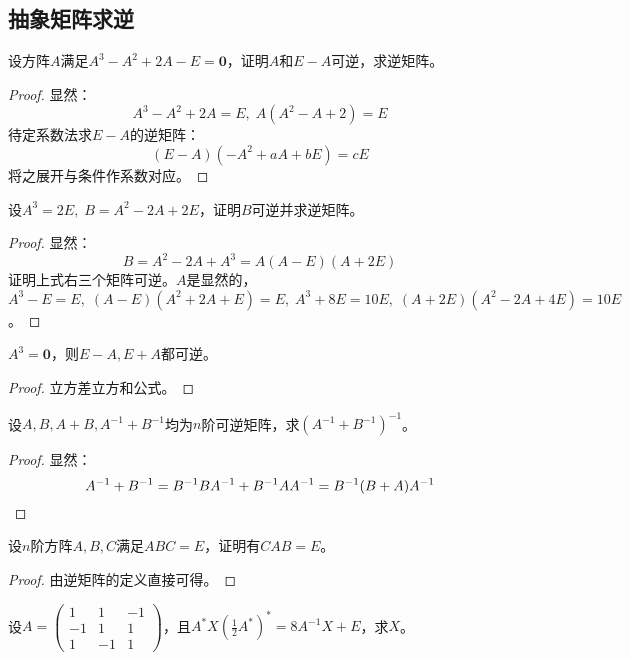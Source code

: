 \subsection{抽象矩阵求逆}
\begin{theorem}
	设方阵$A$满足$A^3-A^2+2A-E=\mathbf{0}$，证明$A$和$E-A$可逆，求逆矩阵。
\end{theorem}
\begin{proof}
	显然：
	\begin{equation*}
		A^3-A^2+2A=E,\;A(A^2-A+2)=E
	\end{equation*} 
	待定系数法求$E-A$的逆矩阵：
	\begin{equation*}
		(E-A)(-A^2+aA+bE)=cE
	\end{equation*}
	将之展开与条件作系数对应。
\end{proof}
\begin{theorem}
	设$A^3=2E,\;B=A^2-2A+2E$，证明$B$可逆并求逆矩阵。
\end{theorem}
\begin{proof}
	显然：
	\begin{equation*}
		B=A^2-2A+A^3=A(A-E)(A+2E)
	\end{equation*}
	证明上式右三个矩阵可逆。$A$是显然的，$A^3-E=E,\;(A-E)(A^2+2A+E)=E,\;A^3+8E=10E,\;(A+2E)(A^2-2A+4E)=10E$。
\end{proof}
\begin{theorem}
	$A^3=\mathbf{0}$，则$E-A,E+A$都可逆。
\end{theorem}
\begin{proof}
	立方差立方和公式。
\end{proof}
\begin{theorem}
	设$A,B,A+B,A^{-1}+B^{-1}$均为$n$阶可逆矩阵，求$(A^{-1}+B^{-1})^{-1}$。
\end{theorem}
\begin{proof}
	显然：
	\begin{equation*}
		A^{-1}+B^{-1}=B^{-1}BA^{-1}+B^{-1}AA^{-1}=B^{-1}(B+A)A^{-1}\qedhere
	\end{equation*}
\end{proof}
\begin{theorem}
	设$n$阶方阵$A,B,C$满足$ABC=E$，证明有$CAB=E$。
\end{theorem}
\begin{proof}
	由逆矩阵的定义直接可得。
\end{proof}
\begin{theorem}
	设$A=\begin{pmatrix}
		1 & 1 & -1 \\
		-1 & 1 & 1 \\
		1 & -1 & 1
	\end{pmatrix}$，且$A^*X(\frac{1}{2}A^*)^*=8A^{-1}X+E$，求$X$。
\end{theorem}
